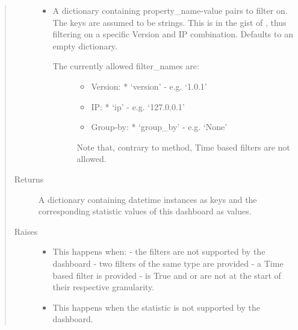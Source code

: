 \documentclass[letterpaper,10pt,english]{sphinxmanual}
\begin{document}
\begin{fulllineitems}
\begin{fulllineitems}
\begin{quote}
\begin{description}
\begin{itemize}
\item {} 
 \textendash{} 
A dictionary containing property\_name-value pairs to filter on. The keys are assumed to be strings.
This is in the gist of , thus filtering on a specific Version and IP combination.
Defaults to an empty dictionary.
\begin{description}
\item[{The currently allowed filter\_names are:}] \leavevmode\begin{itemize}
\item {} 
Version:
* ‘version’ - e.g. ‘1.0.1’

\item {} 
IP:
* ‘ip’ - e.g. ‘127.0.0.1’

\item {} 
Group-by:
* ‘group\_by’ - e.g. ‘None’

\end{itemize}

Note that, contrary to  method, Time based filters are not allowed.

\end{description}


\end{itemize}

\item[{Returns}] \leavevmode
A dictionary containing datetime instances as keys and the corresponding statistic values of this dashboard as values.

\item[{Raises}] \leavevmode\begin{itemize}
\item {} 
 \textendash{} This happens when:
- the filters are not supported by the dashboard
- two filters of the same type are provided
- a Time based filter is provided
-  is True and  or  are not at the start of their respective granularity.

\item {} 
 \textendash{} This happens when the statistic is not supported by the dashboard.

\end{itemize}

\end{description}\end{quote}

\end{fulllineitems}


\end{fulllineitems}
\end{document}
